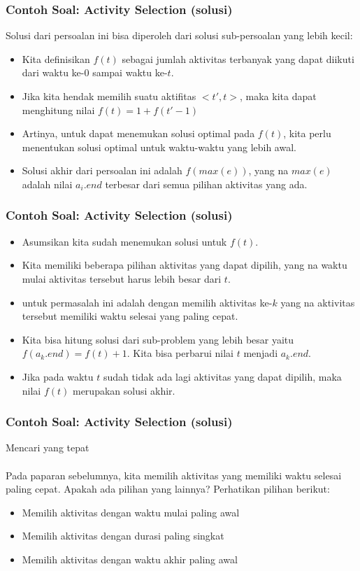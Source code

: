 \begin{frame}
	\frametitle{Contoh Soal: Activity Selection (solusi)}
	Solusi dari persoalan ini bisa diperoleh dari solusi sub-persoalan yang lebih kecil:
	
	\begin{itemize}
		\item Kita definisikan $f(t)$ sebagai jumlah aktivitas terbanyak yang dapat diikuti dari waktu ke-0 sampai waktu ke-$t$.
		\item Jika kita hendak memilih suatu aktifitas $<t' , t>$, maka kita dapat menghitung nilai $f(t) = 1 + f(t' - 1)$ 
		\item Artinya, untuk dapat menemukan solusi optimal pada $f(t)$, kita perlu menentukan solusi optimal untuk waktu-waktu yang lebih awal.
		\item Solusi akhir dari persoalan ini adalah $f(max(e))$, yang na $max(e)$ adalah nilai $a_i.end$ terbesar dari semua pilihan aktivitas yang ada.
	\end{itemize}
\end{frame}

\begin{frame}
	\frametitle{Contoh Soal: Activity Selection (solusi)}
		
	\begin{itemize}
		\item Asumsikan kita sudah menemukan solusi untuk $f(t)$. 
		\item Kita memiliki beberapa pilihan aktivitas yang dapat dipilih, yang na waktu mulai aktivitas tersebut harus lebih besar dari $t$.
		\item  {} untuk permasalah ini adalah dengan memilih aktivitas ke-$k$ yang na aktivitas tersebut memiliki waktu selesai yang paling cepat. 
		\item Kita bisa hitung solusi dari sub-problem yang lebih besar yaitu $f(a_k.end) = f(t) + 1$. Kita bisa perbarui nilai $t$ menjadi $a_k.end$.
		\item Jika pada waktu $t$ sudah tidak ada lagi aktivitas yang dapat dipilih, maka nilai $f(t)$ merupakan solusi akhir.
	\end{itemize}
\end{frame}

\begin{frame}
	\frametitle{Contoh Soal: Activity Selection (solusi)}
	Mencari  yang tepat
	\\~
	\\
	Pada paparan sebelumnya, kita memilih aktivitas yang memiliki waktu selesai paling cepat. Apakah ada pilihan   yang lainnya? Perhatikan pilihan berikut:
	\begin{itemize}
		\item Memilih aktivitas dengan waktu mulai paling awal
		\item Memilih aktivitas dengan durasi paling singkat
		\item Memilih aktivitas dengan waktu akhir paling awal
	\end{itemize}
\end{frame}

